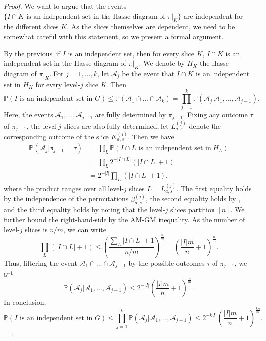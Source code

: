 \documentclass[10pt,a4paper]{amsart}
\begin{document}
\begin{proof}
We want to argue that the events $\{I\cap K\text{ is an independent set in the Hasse diagram of }\pi|_K\}$ are independent for the different slices $K$. As the slices themselves are dependent, we need to be somewhat careful with this statement, so we present a formal argument. 

By the previous, if $I$ is an independent set, then for every slice $K$, $I\cap K$ is an independent set in the Hasse diagram of $\pi|_{K}$. We denote by $H_K$ the Hasse diagram of $\pi|_{K}$. For $j=1,\dots,k$, let $\mathcal{A}_j$ be the event that $I\cap K$ is an independent set in $H_K$ for every level-$j$ slice $K$. Then
$$\mathbb{P}(I\text{ is an independent set in }G)\leq \mathbb{P}(\mathcal{A}_1\cap\dots\cap\mathcal{A}_k)=\prod_{j=1}^{k}\mathbb{P}(\mathcal{A}_j|\mathcal{A}_1,\dots,\mathcal{A}_{j-1}).$$
Here, the events $\mathcal{A}_1,\dots,\mathcal{A}_{j-1}$ are fully determined by $\pi_{j-1}$. Fixing any outcome $\tau$ of $\pi_{j-1}$, the level-$j$ slices are also fully determined, let $L_{a,s}^{(j)}$ denote the corresponding outcome of the slice $K_{a,s}^{(j)}$. Then we have
\begin{align*}
    \mathbb{P}(\mathcal{A}_j|\pi_{j-1}=\tau)&=\prod_{L} \mathbb{P}(I\cap L\text{ is an independent set in }H_{L})\\
    &=\prod_{L}  2^{-|I\cap L|}(|I\cap L|+1)\\
    &=2^{-|I|}\prod_{L}(|I\cap L|+1),
\end{align*}
where the product ranges over all level-$j$ slices $L=L_{a,s}^{(j)}$. The first equality holds by the independence of the permutations $\beta^{(j)}_{a,s}$, the second equality holds by , and the third equality holds by noting that the level-$j$ slices partition $[n]$. We further bound the right-hand-side by the AM-GM inequality. As the number of level-$j$ slices is $n/m$, we can write
$$\prod_{L}(|I\cap L|+1)\leq \left(\frac{\sum_{L} |I\cap L|+1}{n/m}\right)^{\frac{n}{m}}=\left(\frac{|I|m}{n}+1\right)^{\frac{n}{m}}.$$
Thus, filtering the event $\mathcal{A}_1\cap\dots\cap\mathcal{A}_{j-1}$ by the possible outcomes $\tau$ of $\pi_{j-1}$, we get
$$\mathbb{P}(\mathcal{A}_j|\mathcal{A}_1,\dots,\mathcal{A}_{j-1})\leq 2^{-|I|} \left(\frac{|I|m}{n}+1\right)^{\frac{n}{m}}.$$
In conclusion,
$$\mathbb{P}(I\text{ is an independent set in }G)\leq\prod_{j=1}^{k}\mathbb{P}(\mathcal{A}_j|\mathcal{A}_1,\dots,\mathcal{A}_{j-1})\leq 2^{-k|I|} \left(\frac{|I|m}{n}+1\right)^{\frac{kn}{m}}.$$
\end{proof}
\end{document}
